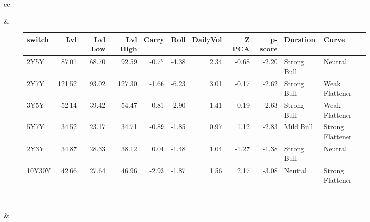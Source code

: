 \documentclass[a4paper,oneside]{report}
\begin{document}
\begin{figure}[htbp]
\begin{tabular}[c]{cc}
 

\begin{subfigure}[c]{0.5\textwidth}
 
 \null\hfill
 \end{subfigure}&
 
\begin{subfigure}[c]{0.5\textwidth}
\begin{adjustbox}{max width=\textwidth}
\begin{tabular}{lrrrrrrrrll}
\hline
 switch &     Lvl &  Lvl Low &  Lvl High &  Carry &  Roll &  DailyVol &  Z PCA &  p-score &     Duration &             Curve \\
\hline
   2Y5Y &   87.01 &    68.70 &     92.59 &  -0.77 & -4.38 &      2.34 &  -0.68 &    -2.20 &  Strong Bull &           Neutral \\
   2Y7Y &  121.52 &    93.02 &    127.30 &  -1.66 & -6.23 &      3.01 &  -0.17 &    -2.62 &  Strong Bull &    Weak Flattener \\
   3Y5Y &   52.14 &    39.42 &     54.47 &  -0.81 & -2.90 &      1.41 &  -0.19 &    -2.63 &  Strong Bull &    Weak Flattener \\
   5Y7Y &   34.52 &    23.17 &     34.71 &  -0.89 & -1.85 &      0.97 &   1.12 &    -2.83 &    Mild Bull &  Strong Flattener \\
   2Y3Y &   34.87 &    28.33 &     38.12 &   0.04 & -1.48 &      1.04 &  -1.27 &    -1.38 &  Strong Bull &           Neutral \\
 10Y30Y &   42.66 &    27.64 &     46.96 &  -2.93 & -1.87 &      1.56 &   2.17 &    -3.08 &      Neutral &  Strong Flattener \\
\hline
\end{tabular}
\end{adjustbox}
 \end{subfigure}\\
 
 
\begin{subfigure}[c]{0.5\textwidth}
 
 \end{subfigure}&
 

\end{tabular}
\end{figure}
\end{document}
